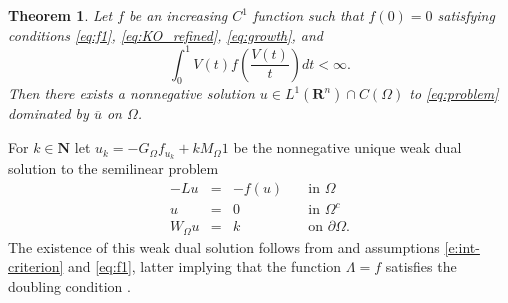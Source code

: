 \documentclass[a4paper,12pt,draft]{article}
\theoremstyle{plain}
\newtheorem{thm}{Theorem}[section]
\theoremstyle{definition}
\numberwithin{equation}{section}
\newcommand\R{\mathbf{R}}
\newcommand{\1}{1}
\begin{document}
\begin{thm}\label{thm:solution}
Let $f$ be an increasing $C^1$ function such that $f(0)=0$ satisfying conditions \eqref{eq:f1}, \eqref{eq:KO_refined}, \eqref{eq:growth}, and
\begin{equation}\label{e:int-criterion}
	\int_{0}^1 V(t)f\left(\frac{V(t)}{t}\right)dt<\infty.
\end{equation}
 Then there exists a nonnegative solution $u\in L^1(\R^n)\cap C(\Omega)$ to \eqref{eq:problem} dominated by $\overline{u}$ on $\Omega$.
\end{thm}
\proof
For $k\in\mathbf N$ let $u_k=-G_\Omega f_{u_k}+kM_\Omega1$ be the nonnegative unique weak dual solution to the semilinear problem 
\begin{equation}\label{e:uk}
\begin{array}{rcll}
		-Lu&=& -f(u)& \quad \text{in } \Omega\\
		u&=&0& \quad \text{in }\Omega^c\\
		W_\Omega u&=&k&\quad \text{on }\partial\Omega.
	\end{array}
\end{equation}
The existence of this weak dual solution follows from \cite[Theorem 5.1]{BVW} and assumptions \eqref{e:int-criterion} and \eqref{eq:f1}, latter implying that the function $\Lambda=f$ satisfies the doubling condition \cite[(5.1)]{BVW}. 
\end{document}
